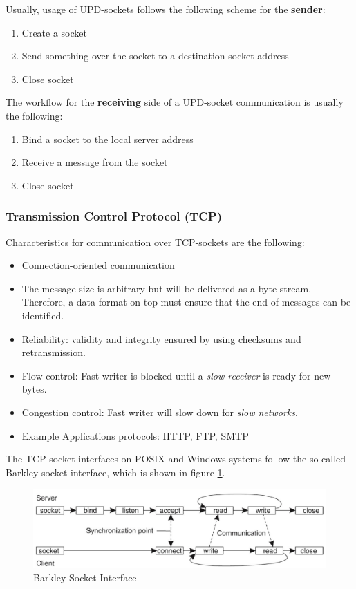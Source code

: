 Usually, usage of UPD-sockets follows the following scheme for the \textbf{sender}:

\begin{enumerate}
    \item Create a socket
    \item Send something over the socket to a destination socket address
    \item Close socket
\end{enumerate}

The workflow for the \textbf{receiving} side of a UPD-socket communication is usually the following:

\begin{enumerate}
    \item Bind a socket to the local server address
    \item Receive a message from the socket
    \item Close socket
\end{enumerate}


\subsubsection{Transmission Control Protocol (TCP)}

Characteristics for communication over TCP-sockets are the following:

\begin{itemize}
    \item Connection-oriented communication
    \item The message size is arbitrary but will be delivered as a byte stream. Therefore, a data format on top must ensure that the end of messages can be identified.
    \item Reliability: validity and integrity ensured by using checksums and retransmission.
    \item Flow control: Fast writer is blocked until a \textit{slow receiver} is ready for new bytes.
    \item Congestion control: Fast writer will slow down for \textit{slow networks}.
    \item Example Applications protocols: HTTP, FTP, SMTP
\end{itemize}

The TCP-socket interfaces on POSIX and Windows systems follow the so-called Barkley socket interface, which is shown in figure \ref{fig:barkley_socket_interface}.

\begin{figure}[h]
    \centering
    \includegraphics[width=\textwidth]{gfx/socket_lifecycle.png}
    \caption{Barkley Socket Interface}
    \label{fig:barkley_socket_interface}
\end{figure}

